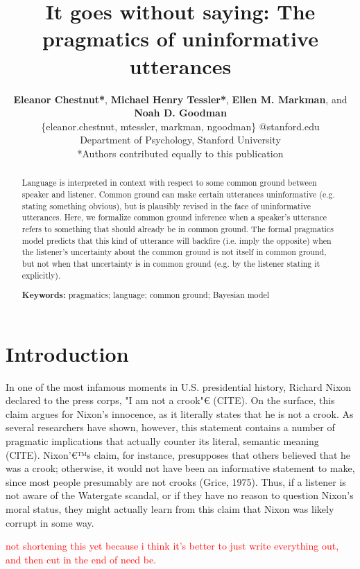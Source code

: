 \documentclass[10pt,letterpaper]{article}
\title{It goes without saying: The pragmatics of uninformative utterances}
\author{{\large \bf Eleanor Chestnut*}, {\large \bf Michael Henry Tessler*},
{\large \bf Ellen M. Markman}, and {\large \bf Noah D. Goodman}  \\
\{eleanor.chestnut, mtessler, markman, ngoodman\} @stanford.edu \\ 
  Department of Psychology, Stanford University \\
  *Authors contributed equally to this publication}
\newcommand{\red}[1]{\textcolor{Red}{#1}}
\begin{document}
\maketitle


\begin{abstract}

Language is interpreted in context with respect to some common ground between speaker and listener.
Common ground can make certain utterances uninformative (e.g. stating something obvious), but is plausibly revised in the face of uninformative utterances.
Here, we formalize common ground inference when a speaker's utterance refers to something that should already be in common ground.
The formal pragmatics model predicts that this kind of utterance will backfire (i.e. imply the opposite) when the listener's uncertainty about the common ground is not itself in common ground, but not when that uncertainty is in common ground (e.g. by the listener stating it explicitly). 


\textbf{Keywords:} 
pragmatics; language; common ground; Bayesian model

\end{abstract}

\section{Introduction}

In one of the most infamous moments in U.S. presidential history, Richard Nixon declared to the press corps, "I am not a crook"€ (CITE).  On the surface, this claim argues for Nixon's innocence, as it literally states that he is not a crook.  As several researchers have shown, however, this statement contains a number of pragmatic implications that actually counter its literal, semantic meaning (CITE).  Nixon'€™s claim, for instance, presupposes that others believed that he was a crook; otherwise, it would not have been an informative statement to make, since most people presumably are not crooks (Grice, 1975).  Thus, if a listener is not aware of the Watergate scandal, or if they have no reason to question Nixon's moral status, they might actually learn from this claim that Nixon was likely corrupt in some way.

\red{not shortening this yet because i think it's better to just write everything out, and then cut in the end of need be.}
\end{document}
